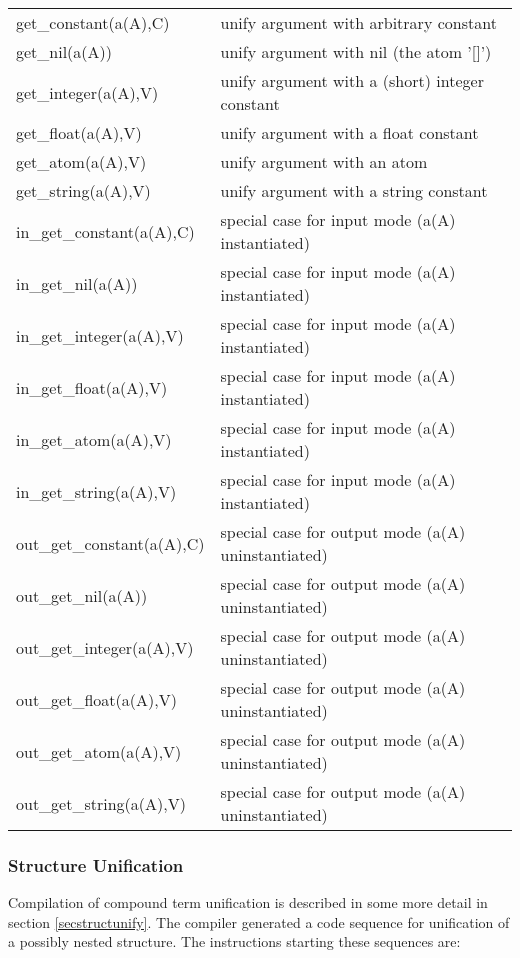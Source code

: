 \begin{tabular}{|p{}|p{}|}
\hline
get_constant(a(A),C)    & unify argument with arbitrary constant \\
get_nil(a(A))           & unify argument with nil (the atom '[]') \\
get_integer(a(A),V)     & unify argument with a (short) integer constant \\
get_float(a(A),V)       & unify argument with a float constant \\
get_atom(a(A),V)        & unify argument with an atom \\
get_string(a(A),V)      & unify argument with a string constant \\
\hline
in_get_constant(a(A),C) & special case for input mode (a(A) instantiated) \\
in_get_nil(a(A))        & special case for input mode (a(A) instantiated) \\
in_get_integer(a(A),V)  & special case for input mode (a(A) instantiated) \\
in_get_float(a(A),V)    & special case for input mode (a(A) instantiated) \\
in_get_atom(a(A),V)     & special case for input mode (a(A) instantiated) \\
in_get_string(a(A),V)   & special case for input mode (a(A) instantiated) \\
\hline
out_get_constant(a(A),C)& special case for output mode (a(A) uninstantiated) \\
out_get_nil(a(A))       & special case for output mode (a(A) uninstantiated) \\
out_get_integer(a(A),V) & special case for output mode (a(A) uninstantiated) \\
out_get_float(a(A),V)   & special case for output mode (a(A) uninstantiated) \\
out_get_atom(a(A),V)    & special case for output mode (a(A) uninstantiated) \\
out_get_string(a(A),V)  & special case for output mode (a(A) uninstantiated) \\
\hline
\end{tabular}

\subsubsection{Structure Unification}
Compilation of compound  term unification is described in some more
detail in section \ref{secstructunify}. The compiler generated a code sequence
for unification of a possibly nested structure. The instructions starting
these sequences are:

